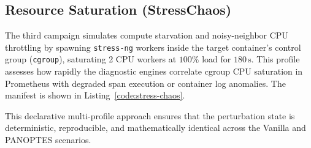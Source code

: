 

\subsection{Resource Saturation (StressChaos)}
The third campaign simulates compute starvation and noisy-neighbor CPU throttling by spawning \texttt{stress-ng} workers inside the target container's control group (\texttt{cgroup}), saturating 2 CPU workers at $100\%$ load for $180\,\text{s}$. This profile assesses how rapidly the diagnostic engines correlate cgroup CPU saturation in Prometheus with degraded span execution or container log anomalies. The manifest is shown in Listing~\ref{code:stress-chaos}.



This declarative multi-profile approach ensures that the perturbation state is deterministic, reproducible, and mathematically identical across the Vanilla and PANOPTES scenarios.
